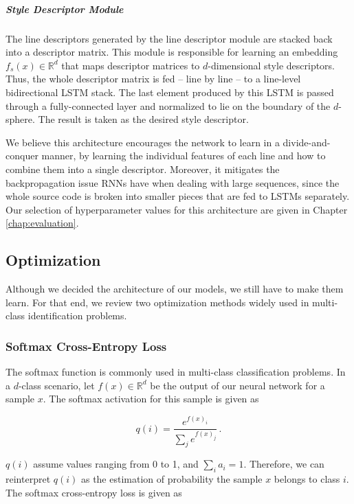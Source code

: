 \subparagraph*{Style Descriptor Module}

The line descriptors generated by the line descriptor module are stacked back into a descriptor matrix. This module is responsible for learning an embedding $f_s(x) \in \mathbb{R}^d$ that maps descriptor matrices to $d$-dimensional style descriptors. Thus, the whole descriptor matrix is fed -- line by line -- to a line-level bidirectional LSTM stack. The last element produced by this LSTM is passed through a fully-connected layer and normalized to lie on the boundary of the $d$-sphere. The result is taken as the desired style descriptor.

We believe this architecture encourages the network to learn in a divide-and-conquer manner, by learning the individual features of each line and how to combine them into a single descriptor. Moreover, it mitigates the backpropagation issue RNNs have when dealing with large sequences, since the whole source code is broken into smaller pieces that are fed to LSTMs separately. Our selection of hyperparameter values for this architecture are given in Chapter \ref{chap:evaluation}.

\subsection{Optimization}\label{sec:optimization}
Although we decided the architecture of our models, we still have to make them learn. For that end, we review two optimization methods widely used in multi-class identification problems.

\subsubsection{Softmax Cross-Entropy Loss}\label{sec:softmax}

The softmax function is commonly used in multi-class classification problems. In a $d$-class scenario, let $f(x) \in \mathbb{R}^d$ be the output of our neural network for a sample $x$. The softmax activation for this sample is given as

\begin{equation}
q(i) = \frac{e^{f(x)_i}}{\sum_j e^{f(x)_j}} \,.
\end{equation}

$q(i)$ assume values ranging from 0 to 1, and $\sum_i a_i = 1$. Therefore, we can reinterpret $q(i)$ as the estimation of probability the sample $x$ belongs to class $i$. The softmax cross-entropy loss is given as

